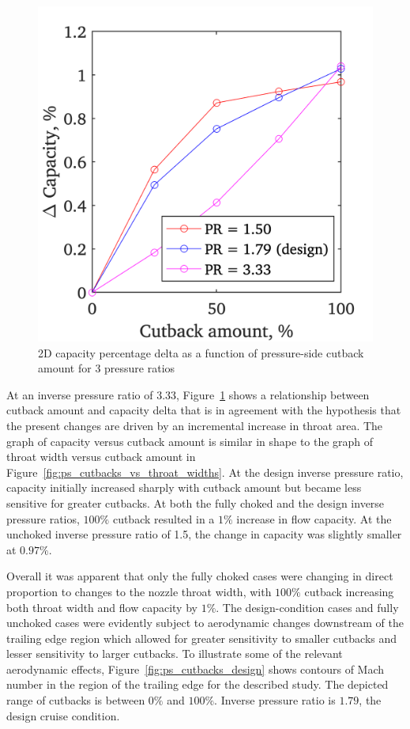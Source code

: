 \documentclass[a4paper, 11pt, oneside]{report}
\begin{document}
\begin{figure}[H]
	\centering
	\includegraphics[width=.45\textwidth]{figs/ps_cutbacks_vs_capacities.png}
	\caption{2D capacity percentage delta as a function of pressure-side cutback amount for 3 pressure ratios}
    \label{fig:ps_cutbacks_vs_capacities}
\end{figure}

At an inverse pressure ratio of 3.33, Figure~\ref{fig:ps_cutbacks_vs_capacities} shows a relationship between cutback amount and capacity delta that is in agreement with the hypothesis that the present changes are driven by an incremental increase in throat area. The graph of capacity versus cutback amount is similar in shape to the graph of throat width versus cutback amount in Figure~\ref{fig:ps_cutbacks_vs_throat_widths}. At the design inverse pressure ratio, capacity initially increased sharply with cutback amount but became less sensitive for greater cutbacks. At both the fully choked and the design inverse pressure ratios, $100\%$ cutback resulted in a $1\%$ increase in flow capacity. At the unchoked inverse pressure ratio of 1.5, the change in capacity was slightly smaller at $0.97\%$. 

Overall it was apparent that only the fully choked cases were changing in direct proportion to changes to the nozzle throat width, with $100\%$ cutback increasing both throat width and flow capacity by $1\%$. The design-condition cases and fully unchoked cases were evidently subject to aerodynamic changes downstream of the trailing edge region which allowed for greater sensitivity to smaller cutbacks and lesser sensitivity to larger cutbacks. To illustrate some of the relevant aerodynamic effects, Figure~\ref{fig:ps_cutbacks_design} shows contours of Mach number in the region of the trailing edge for the described study. The depicted range of cutbacks is between $0\%$ and $100\%$. Inverse pressure ratio is $1.79$, the design cruise condition.
\end{document}
